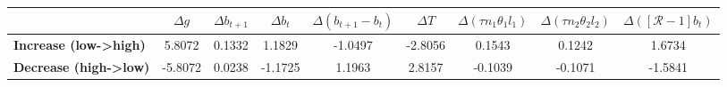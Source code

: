 \begin{tiny}\begin{tabular}{|l|c|c|c|c|c|c|c|c|}
\hline
&\textbf{$\Delta g$}&\textbf{$\Delta b_{t+1}$}&\textbf{$\Delta b_{t}$}&\textbf{$\Delta (b_{t+1}-b_{t})$}&\textbf{$\Delta T$}&\textbf{$\Delta (\tau n_1\theta_1 l_1 )$}&\textbf{$\Delta (\tau n_2\theta_2 l_2)$}&\textbf{$\Delta ([\mathcal{R}-1]b_t)$}\\\hline
\textbf{Increase (low->high)}&5.8072&0.1332&1.1829&-1.0497&-2.8056&0.1543&0.1242&1.6734\\\hline
\textbf{Decrease (high->low)}&-5.8072&0.0238&-1.1725&1.1963&2.8157&-0.1039&-0.1071&-1.5841\\\hline
\end{tabular}
\end{tiny}